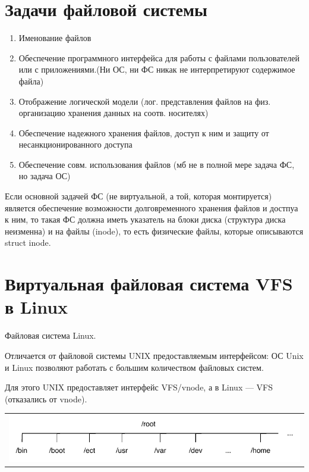 \section{Задачи файловой системы}
\begin{enumerate}
    \item Именование файлов
    \item Обеспечение программного интерфейса для работы с файлами пользователей или с приложениями.(Ни ОС, ни ФС никак не интерпретируют содержимое файла)
    \item Отображение логической модели (лог. представления файлов на физ. организацию хранения данных на соотв. носителях)
    \item Обеспечение надежного хранения файлов, доступ к ним и защиту от несанкционированного доступа
    \item Обеспечение совм. использования файлов (мб не в полной мере задача ФС, но задача ОС)
\end{enumerate}

Если основной задачей ФС (не виртуальной, а той, которая монтируется) является обеспечение возможности долговременного хранения файлов и достпуа к ним, то такая ФС должна иметь указатель на блоки диска (структура диска неизменна) и на файлы (inode), то есть физические файлы, которые описываются struct inode.

\section{Виртуальная файловая система VFS в Linux}

Файловая система Linux.

Отличается от файловой системы UNIX предоставляемым интерфейсом: ОС Unix и Linux позволяют работать с большим количеством файловых систем.

Для этого UNIX предоставляет интерфейс VFS/vnode, а в Linux — VFS (отказались от vnode).

\begin{table}[h!]
  \centering
  \begin{tabular}{p{1\linewidth}}
    \centering
    \includegraphics[width=0.8\linewidth]{./images/root.pdf}
  \end{tabular}
\end{table}

